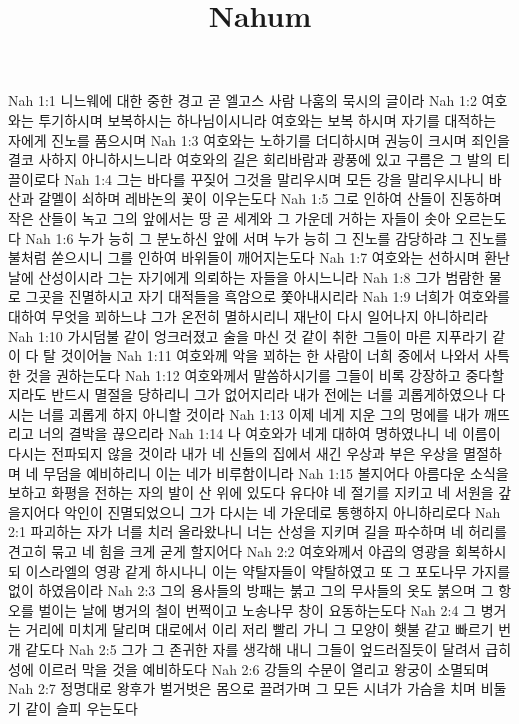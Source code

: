 

\title{Nahum}

Nah 1:1  니느웨에 대한 중한 경고 곧 엘고스 사람 나훔의 묵시의 글이라
Nah 1:2  여호와는 투기하시며 보복하시는 하나님이시니라 여호와는 보복 하시며 자기를 대적하는 자에게 진노를 품으시며
Nah 1:3  여호와는 노하기를 더디하시며 권능이 크시며 죄인을 결코 사하지 아니하시느니라 여호와의 길은 회리바람과 광풍에 있고 구름은 그 발의 티끌이로다
Nah 1:4  그는 바다를 꾸짖어 그것을 말리우시며 모든 강을 말리우시나니 바산과 갈멜이 쇠하며 레바논의 꽃이 이우는도다
Nah 1:5  그로 인하여 산들이 진동하며 작은 산들이 녹고 그의 앞에서는 땅 곧 세계와 그 가운데 거하는 자들이 솟아 오르는도다
Nah 1:6  누가 능히 그 분노하신 앞에 서며 누가 능히 그 진노를 감당하랴 그 진노를 불처럼 쏟으시니 그를 인하여 바위들이 깨어지는도다
Nah 1:7  여호와는 선하시며 환난 날에 산성이시라 그는 자기에게 의뢰하는 자들을 아시느니라
Nah 1:8  그가 범람한 물로 그곳을 진멸하시고 자기 대적들을 흑암으로 쫓아내시리라
Nah 1:9  너희가 여호와를 대하여 무엇을 꾀하느냐 그가 온전히 멸하시리니 재난이 다시 일어나지 아니하리라
Nah 1:10  가시덤불 같이 엉크러졌고 술을 마신 것 같이 취한 그들이 마른 지푸라기 같이 다 탈 것이어늘
Nah 1:11  여호와께 악을 꾀하는 한 사람이 너희 중에서 나와서 사특한 것을 권하는도다
Nah 1:12  여호와께서 말씀하시기를 그들이 비록 강장하고 중다할지라도 반드시 멸절을 당하리니 그가 없어지리라 내가 전에는 너를 괴롭게하였으나 다시는 너를 괴롭게 하지 아니할 것이라
Nah 1:13  이제 네게 지운 그의 멍에를 내가 깨뜨리고 너의 결박을 끊으리라
Nah 1:14  나 여호와가 네게 대하여 명하였나니 네 이름이 다시는 전파되지 않을 것이라 내가 네 신들의 집에서 새긴 우상과 부은 우상을 멸절하며 네 무덤을 예비하리니 이는 네가 비루함이니라
Nah 1:15  볼지어다 아름다운 소식을 보하고 화평을 전하는 자의 발이 산 위에 있도다 유다야 네 절기를 지키고 네 서원을 갚을지어다 악인이 진멸되었으니 그가 다시는 네 가운데로 통행하지 아니하리로다
Nah 2:1  파괴하는 자가 너를 치러 올라왔나니 너는 산성을 지키며 길을 파수하며 네 허리를 견고히 묶고 네 힘을 크게 굳게 할지어다
Nah 2:2  여호와께서 야곱의 영광을 회복하시되 이스라엘의 영광 같게 하시나니 이는 약탈자들이 약탈하였고 또 그 포도나무 가지를 없이 하였음이라
Nah 2:3  그의 용사들의 방패는 붉고 그의 무사들의 옷도 붉으며 그 항오를 벌이는 날에 병거의 철이 번쩍이고 노송나무 창이 요동하는도다
Nah 2:4  그 병거는 거리에 미치게 달리며 대로에서 이리 저리 빨리 가니 그 모양이 횃불 같고 빠르기 번개 같도다
Nah 2:5  그가 그 존귀한 자를 생각해 내니 그들이 엎드러질듯이 달려서 급히 성에 이르러 막을 것을 예비하도다
Nah 2:6  강들의 수문이 열리고 왕궁이 소멸되며
Nah 2:7  정명대로 왕후가 벌거벗은 몸으로 끌려가며 그 모든 시녀가 가슴을 치며 비둘기 같이 슬피 우는도다
